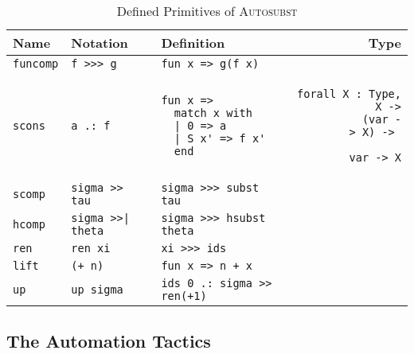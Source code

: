\documentclass{scrartcl}
\newcommand{\Autosubst}{\textsc{Autosubst}\xspace}
\newcommand{\stackr}[2]{\vtop{\setbox0\hbox{\strut #1}\copy0\hbox to\wd0{\hss\strut #2}}}
\newcommand{\lst}{\lstinline}
\begin{document}
\begin{table}
  \centering
  \lstset{boxpos=t, aboveskip=0em, belowskip=0em}
  \begin{tabular}{l l l r}
  Name & Notation         & Definition                                       & Type                                   \\\hline\noalign{\vspace{0.5em}}
  
  \lst$funcomp$ & \lst$f >>> g$    & \lst$fun x => g(f x)$                            & \stackr{\lst$forall A B C : Type, (A -> B) ->$}{\stackr{\lst$(B -> C) ->$}{\lst$A -> C$}} \\\noalign{\vspace{-1em}}
  \begin{lstlisting}
scons
  \end{lstlisting}
 & \begin{lstlisting}
a .: f
  \end{lstlisting}
&\begin{lstlisting}
fun x => 
  match x with 
  | 0 => a 
  | S x' => f x' 
  end    
\end{lstlisting}
&
\begin{lstlisting}
forall X : Type,         X ->
           (var -> X) -> 
                var -> X
\end{lstlisting}  \\
  \lst$scomp$ & \lst$sigma >> tau$& \lst$sigma >>> subst tau$    & 
\stackr{\lst$(var -> term) ->$}{\stackr{\lst$(var -> term) ->$}{\lst$var -> term$}}     \\
\lst$hcomp$ & \lst$sigma >>| theta$& \lst$sigma >>> hsubst theta$ & 
\stackr{\lst$(var -> term1) ->$}{\stackr{\lst$(var -> term2) ->$}{\lst$var -> term1$}} \\
\lst$ren$ & \lst$ren xi$ & \lst$xi >>> ids$ & \stackr{\lst$(var -> var) ->$}{\lst$var -> term$} \\
\lst$lift$ & \lst$(+ n)$ & \lst$fun x => n + x$ & \stackr{\lst$var ->$}{\lst$var -> var$} \\
\lst$up$ & \lst$up sigma$ & \lst$ids 0 .: sigma >> ren(+1)$ &  \stackr{\lst$(var -> term) ->$}{\lst$var -> term$} 
\end{tabular}
  \caption{Defined Primitives of \Autosubst}
  \label{tab:defined-ops}
\end{table}

\subsection{The Automation Tactics}
\label{sec:lstautosubst-tactic}
\end{document}
